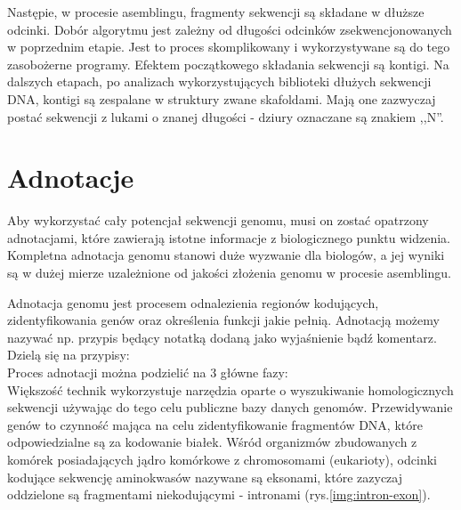 Następie, w procesie asemblingu, fragmenty sekwencji są składane w dłuższe odcinki. Dobór algorytmu jest zależny od długości odcinków zsekwencjonowanych w poprzednim etapie. Jest to proces skomplikowany i wykorzystywane są do tego zasobożerne programy. 
Efektem początkowego składania sekwencji są kontigi.
Na dalszych etapach, po analizach wykorzystujących biblioteki dłużych sekwencji DNA, kontigi są zespalane w struktury zwane skafoldami.
Mają one zazwyczaj postać sekwencji z lukami o znanej długości - dziury oznaczane są znakiem ,,N''.

\section{Adnotacje}
Aby wykorzystać cały potencjał sekwencji genomu, musi on zostać opatrzony adnotacjami, które zawierają istotne informacje z biologicznego punktu widzenia. Kompletna adnotacja genomu stanowi duże wyzwanie dla biologów, a jej wyniki są w dużej mierze uzależnione od jakości złożenia genomu w procesie asemblingu.

Adnotacja genomu jest procesem odnalezienia regionów kodujących, zidentyfikowania genów oraz określenia funkcji jakie pełnią. Adnotacją możemy nazywać np. przypis będący notatką dodaną jako wyjaśnienie bądź komentarz. Dzielą się na przypisy:
\\
Proces adnotacji można podzielić na 3 główne fazy:
\\

Większość technik wykorzystuje narzędzia oparte o wyszukiwanie homologicznych sekwencji używając do tego celu publiczne bazy danych genomów. Przewidywanie genów to czynność mająca na celu zidentyfikowanie fragmentów DNA, które odpowiedzialne są za kodowanie białek. Wśród organizmów zbudowanych z komórek posiadających jądro komórkowe z chromosomami (eukarioty), odcinki kodujące sekwencję aminokwasów nazywane są eksonami, które zazyczaj oddzielone są fragmentami niekodującymi - intronami (rys.\ref{img:intron-exon}).


